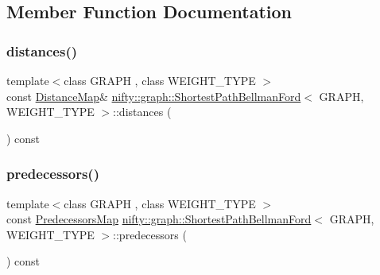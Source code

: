 \subsection{Member Function Documentation}
\mbox{\label{classnifty_1_1graph_1_1ShortestPathBellmanFord_a7c44f07f599f66f5831058b4156065d0}} 
\subsubsection{\texorpdfstring{distances()}{distances()}}
{\footnotesize\ttfamily template$<$class G\+R\+A\+PH , class W\+E\+I\+G\+H\+T\+\_\+\+T\+Y\+PE $>$ \\
const \hyperlink{classnifty_1_1graph_1_1ShortestPathBellmanFord_a00b64f4bc8316d99c4f029b2b37da74c}{Distance\+Map}\& \hyperlink{classnifty_1_1graph_1_1ShortestPathBellmanFord}{nifty\+::graph\+::\+Shortest\+Path\+Bellman\+Ford}$<$ G\+R\+A\+PH, W\+E\+I\+G\+H\+T\+\_\+\+T\+Y\+PE $>$\+::distances (\begin{DoxyParamCaption}{ }\end{DoxyParamCaption}) const\hspace{0.3cm}{\ttfamily [inline]}}

\mbox{\label{classnifty_1_1graph_1_1ShortestPathBellmanFord_af630b1048d1a4f3c5ccf410a96dd1e42}} 
\subsubsection{\texorpdfstring{predecessors()}{predecessors()}}
{\footnotesize\ttfamily template$<$class G\+R\+A\+PH , class W\+E\+I\+G\+H\+T\+\_\+\+T\+Y\+PE $>$ \\
const \hyperlink{classnifty_1_1graph_1_1ShortestPathBellmanFord_a9eca03af1ee4e886ed7da46dae5d5703}{Predecessors\+Map} \hyperlink{classnifty_1_1graph_1_1ShortestPathBellmanFord}{nifty\+::graph\+::\+Shortest\+Path\+Bellman\+Ford}$<$ G\+R\+A\+PH, W\+E\+I\+G\+H\+T\+\_\+\+T\+Y\+PE $>$\+::predecessors (\begin{DoxyParamCaption}{ }\end{DoxyParamCaption}) const\hspace{0.3cm}{\ttfamily [inline]}}

